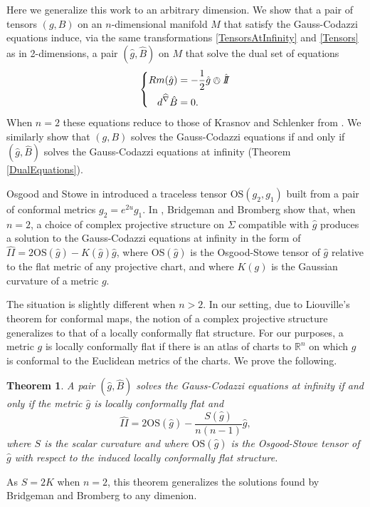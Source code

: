 \documentclass{amsart}
\newcommand{\R}{\mathbb{R}}
\newcommand{\two}{I\!\!I}
\newtheorem{bigthm}{Theorem}
\numberwithin{equation}{section}
\begin{document}
Here we generalize this work to an arbitrary dimension.
We show that a pair of tensors $(g,B)$ on an $n$-dimensional manifold $M$ that satisfy the Gauss-Codazzi equations induce, via the same transformations \eqref{TensorsAtInfinity} and \eqref{Tensors} as in 2-dimensions, a pair $(\hat{g},\hat{B})$ on $M$ that solve the dual set of equations
\[
\left\{
\begin{aligned}
Rm(\hat{g}) &= -\frac{1}{2}\hat{g} \owedge \hat{\two} \\
d^{\widehat{\nabla}}\hat{B} &= 0.
\end{aligned}
\right.
\]
When $n=2$ these equations reduce to those of Krasnov and Schlenker from \cite{Krasnov-Schlenker2008}. 
We similarly show that $(g,B)$ solves the Gauss-Codazzi equations if and only if $(\hat{g},\hat{B})$ solves the Gauss-Codazzi equations at infinity (Theorem \ref{DualEquations}).


Osgood and Stowe in \cite{Osgood-Stowe1992} introduced a traceless tensor $\mathrm{OS}(g_2,g_1)$ built from a pair of conformal metrics $g_2 = e^{2u}g_1$.
In \cite{Bridgeman-Bromberg2022}, Bridgeman and Bromberg show that, when $n = 2$, a choice of complex projective structure on $\Sigma$ compatible with $\hat{g}$ produces a solution to the Gauss-Codazzi equations at infinity in the form of $\hat{\two} = 2\mathrm{OS}(\hat{g}) - K(\hat{g})\hat{g}$, where $\mathrm{OS}(\hat{g})$ is the Osgood-Stowe tensor of $\hat{g}$ relative to the flat metric of any projective chart, and where $K(g)$ is the Gaussian curvature of a metric $g$.

The situation is slightly different when $n > 2$.
In our setting, due to Liouville's theorem for conformal maps, the notion of a complex projective structure generalizes to that of a locally conformally flat structure. 
For our purposes, a metric $g$ is locally conformally flat if there is an atlas of charts to $\R^n$ on which $g$ is conformal to the Euclidean metrics of the charts.
We prove the following.

\begin{bigthm}
\label{bigthm1}
A pair $(\hat{g},\hat{B})$ solves the Gauss-Codazzi equations at infinity if and only if the metric $\hat{g}$ is locally conformally flat and
\[
\hat{\two} = 2\mathrm{OS}(\hat{g}) - \frac{S(\hat{g})}{n(n-1)}\hat{g},
\]
where $S$ is the scalar curvature and where $\mathrm{OS}(\hat{g})$ is the Osgood-Stowe tensor of $\hat{g}$ with respect to the induced locally conformally flat structure.
\end{bigthm}
\noindent
As $S = 2K$ when $n=2$, this theorem generalizes the solutions found by Bridgeman and Bromberg to any dimenion.
\end{document}
